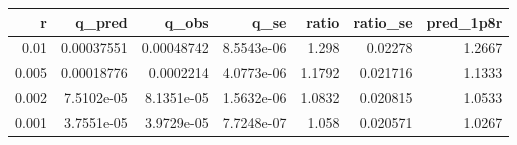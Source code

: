 \begin{tabular}{rrrrrrr}
\toprule
r & q_pred & q_obs & q_se & ratio & ratio_se & pred_1p8r \\
\midrule
0.01 & 0.00037551 & 0.00048742 & 8.5543e-06 & 1.298 & 0.02278 & 1.2667 \\
0.005 & 0.00018776 & 0.0002214 & 4.0773e-06 & 1.1792 & 0.021716 & 1.1333 \\
0.002 & 7.5102e-05 & 8.1351e-05 & 1.5632e-06 & 1.0832 & 0.020815 & 1.0533 \\
0.001 & 3.7551e-05 & 3.9729e-05 & 7.7248e-07 & 1.058 & 0.020571 & 1.0267 \\
\bottomrule
\end{tabular}
